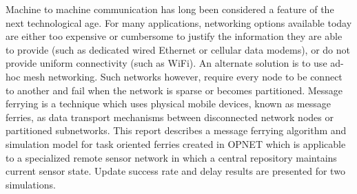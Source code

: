 Machine to machine communication has long been considered a feature of the next technological age. 
For many applications, networking options available today are either too expensive or cumbersome to justify the information they are able to provide (such as dedicated wired Ethernet or cellular data modems), or do not provide uniform connectivity (such as WiFi). 
An alternate solution is to use ad-hoc mesh networking. 
Such networks however, require every node to be connect to another and fail when the network is sparse or becomes partitioned.
Message ferrying is a technique which uses physical mobile devices, known as message ferries, as data transport mechanisms between disconnected network nodes or partitioned subnetworks.
This report describes a message ferrying algorithm and simulation model for task oriented ferries created in OPNET which is applicable to a specialized remote sensor network in which a central repository maintains current sensor state.
Update success rate and delay results are presented for two simulations.
